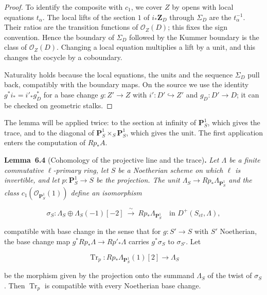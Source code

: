 \documentclass[11pt]{article}
\newenvironment{bpstatement}[2]{\par\addvspace{0.6\baselineskip}\noindent\textbf{#1}#2\textbf{.}\enspace\ignorespaces}
  {\par\addvspace{0.4\baselineskip}}
\newenvironment{bpstatementit}[2]{\begin{bpstatement}{#1}{#2}\itshape\ignorespaces}{\end{bpstatement}}
\begin{document}
\begin{proof}[{Proof}]
To identify the composite with \(c_1\), we cover \(Z\) by opens with local equations \(t_\alpha\). The local lifts of the section \(1\) of \(i_*\mathbf Z_D\) through \(\Sigma_D\) are the \(t_\alpha^{-1}\). Their ratios are the transition functions of \(\mathcal O_Z(D)\); this fixes the sign convention. Hence the boundary of \(\Sigma_D\) followed by the Kummer boundary is the class of \(\mathcal O_Z(D)\). Changing a local equation multiplies a lift by a unit, and this changes the cocycle by a coboundary.

Naturality holds because the local equations, the units and the sequence \(\Sigma_D\) pull back, compatibly with the boundary maps. On the source we use the identity \(g^*i_*=i'_*g_D^*\) for a base change \(g:Z'\to Z\) with \(i':D'\hookrightarrow Z'\) and \(g_D:D'\to D\); it can be checked on geometric stalks.
\end{proof}

\label{bp13}%
The lemma will be applied twice: to the section at infinity of \(\mathbf P^1_S\), which gives the trace, and to the diagonal of \(\mathbf P^1_S\times_S\mathbf P^1_S\), which gives the unit. The first application enters the computation of \(Rp_*A\).

\label{bp14}%
\begin{bpstatementit}{Lemma~6.4}{ (Cohomology of the projective line and the trace)}
Let \(\Lambda\) be a finite commutative \(\ell\)-primary ring, let \(S\) be a Noetherian scheme on which \(\ell\) is invertible, and let \(p:\mathbf P^1_S\to S\) be the projection. The unit \(\Lambda_S\to Rp_*\Lambda_{\mathbf P^1_S}\) and the class \(c_1(\mathcal O_{\mathbf P^1_S}(1))\) define an isomorphism

\[
\sigma_S:\Lambda_S\oplus\Lambda_S(-1)[-2]
\ \xrightarrow{\ \sim\ }\ Rp_*\Lambda_{\mathbf P^1_S}
\quad\text{in }D^+(S_{\acute{e}t},\Lambda),
\tag{6.4}
\]

compatible with base change in the sense that for \(g:S'\to S\) with \(S'\) Noetherian, the base change map \(g^*Rp_*\Lambda\to Rp'_*\Lambda\) carries \(g^*\sigma_S\) to \(\sigma_{S'}\). Let

\[
\operatorname{Tr}_p:Rp_*\Lambda_{\mathbf P^1_S}(1)[2]\longrightarrow\Lambda_S
\tag{6.5}
\]

be the morphism given by the projection onto the summand \(\Lambda_S\) of the twist of \(\sigma_S\). Then \(\operatorname{Tr}_p\) is compatible with every Noetherian base change.
\end{bpstatementit}
\end{document}
